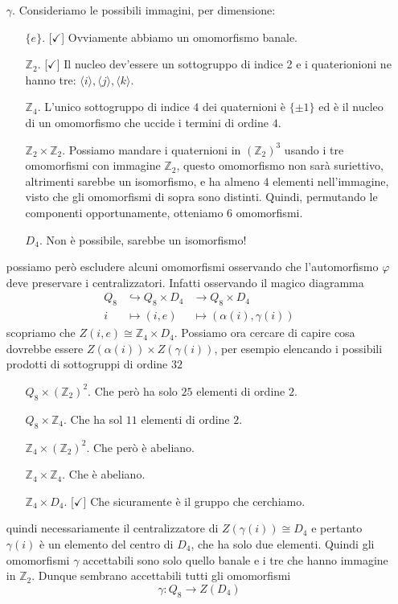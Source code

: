 \begin{multicols}{2}
\begin{itemize}
	 	\item [$ \gamma $.] Consideriamo le possibili immagini, per dimensione:
	 	\begin{itemize}
	 		\item [$\{e\}  $.][$ \checkmark $] Ovviamente abbiamo un omomorfismo banale.
	 		\item [$ \mathbb{Z}_2 $.][$ \checkmark $] Il nucleo dev'essere un sottogruppo di indice 2 e i quaterionioni ne hanno tre: $ \langle i \rangle, \langle j \rangle, \langle k \rangle $.
	 		\item [$ \mathbb{Z}_4 $.] L'unico sottogruppo di indice $ 4 $ dei quaternioni è $ \{\pm 1\} $ ed è il nucleo di un omomorfismo che uccide i termini di ordine $ 4 $.
	 		\item [$ \mathbb{Z}_2\times\mathbb{Z}_2 $.] Possiamo mandare i quaternioni in $ \left(\mathbb{Z}_2\right)^3 $ usando i tre omomorfismi con immagine $ \mathbb{Z}_2 $, questo omomorfismo non sarà suriettivo, altrimenti sarebbe un isomorfismo, e ha almeno $ 4 $ elementi nell'immagine, visto che gli omomorfismi di sopra sono distinti. Quindi, permutando le componenti opportunamente, otteniamo $ 6 $ omomorfismi.
	 		\item [$ D_4 $.] Non è possibile, sarebbe un isomorfismo!
	 	\end{itemize}
	 	possiamo però escludere alcuni omomorfismi osservando che l'automorfismo $ \varphi $ deve preservare i centralizzatori. Infatti osservando il magico diagramma
	 	\begin{align*}
	 		Q_8 &\hookrightarrow Q_8 \times D_4 &\rightarrow Q_8 \times D_4 \\
	 		i &\mapsto (i, e) &\mapsto (\alpha(i), \gamma(i))
	 	\end{align*}
		 scopriamo che $ Z(i, e) \cong \mathbb{Z}_4 \times D_4 $. Possiamo ora cercare di capire cosa dovrebbe essere $ Z(\alpha(i))\times Z(\gamma(i)) $, per esempio elencando i possibili prodotti di sottogruppi di ordine $ 32 $
		 \begin{itemize}
		 	\item [$ Q_8 \times \left(\mathbb{Z}_2\right)^2 $.]
		 	Che però ha solo $ 25 $ elementi di ordine $ 2 $.
		 	\item [$ Q_8 \times \mathbb{Z}_4 $.]
		 	Che ha sol $ 11 $ elementi di ordine $ 2 $.
		 	\item [$ \mathbb{Z}_4 \times \left(\mathbb{Z}_2\right)^2 $.] Che però è abeliano.
		 	\item [$ \mathbb{Z}_4 \times \mathbb{Z}_4 $.] Che è abeliano.
		 	\item [$ \mathbb{Z}_4 \times D_4$.][$ \checkmark $] Che sicuramente è il gruppo che cerchiamo.
		 \end{itemize}
	 quindi necessariamente il centralizzatore di $ Z(\gamma(i)) \cong D_4 $ e pertanto $ \gamma(i) $ è un elemento del centro di $ D_4 $, che ha solo due elementi. Quindi gli omomorfismi $ \gamma $ accettabili sono solo quello banale e i tre che hanno immagine in $ \mathbb{Z}_2 $. Dunque sembrano accettabili tutti gli omomorfismi
	 \[ \boxed{\gamma: Q_8 \to Z(D_4)} \]
	 

\end{itemize}
\end{multicols}

